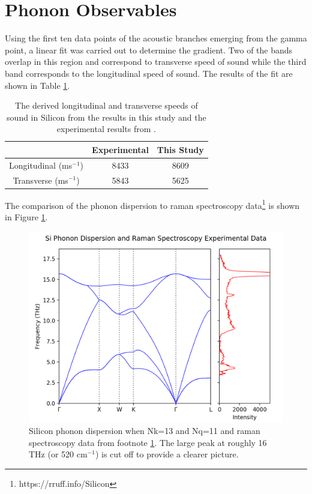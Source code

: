 \documentclass[12pt]{article}
\begin{document}
\clearpage	
\section*{Phonon Observables}

Using the first ten data points of the acoustic branches emerging from the gamma point, a linear fit was carried out to determine the gradient. Two of the bands overlap in this region and correspond to transverse speed of sound while the third band corresponds to the longitudinal speed of sound.
The results of the fit are shown in Table \ref{tab:c}. 

\bigskip

\begin{table}[!htpb]
	\centering
	\begin{tabular}{c|c|c|}
		\cline{2-3}
		& Experimental & This Study \\ \hline
		\multicolumn{1}{|c|}{Longitudinal (ms$^{-1}$)} & 8433         & 8609       \\ \hline
		\multicolumn{1}{|c|}{Transverse (ms$^{-1}$)}   & 5843         & 5625       \\ \hline
	\end{tabular}
\caption{The derived longitudinal and transverse speeds of sound in Silicon from the results in this study and the experimental results from \cite{sic}.}
\label{tab:c}
\end{table}

\bigskip

\noindent The comparison of the phonon dispersion to raman spectroscopy data\footnote{\label{ramandata}https://rruff.info/Silicon} is shown in Figure \ref{fig:raman}.

\begin{figure}[!htpb]
	\centering
	\includegraphics[width=12cm]{../Figures/raman.png}
	\caption{Silicon phonon dispersion when Nk=13 and Nq=11 and raman spectroscopy data from footnote \ref{ramandata}. The large peak at roughly 16 THz (or 520 cm$^{-1}$) is cut off to provide a clearer picture. }
	\label{fig:raman}
\end{figure}
\end{document}
